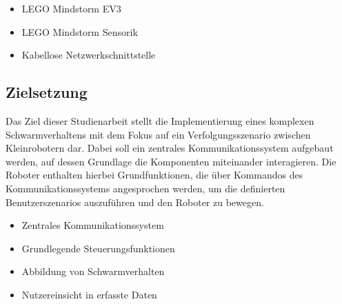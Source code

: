 \begin{itemize}
	\item LEGO Mindstorm EV3
	\item LEGO Mindstorm Sensorik
	\item Kabellose Netzwerkschnittstelle
\end{itemize}

\subsection{Zielsetzung}

Das Ziel dieser Studienarbeit stellt die Implementierung eines komplexen Schwarmverhaltens mit dem Fokus auf ein Verfolgungsszenario zwischen Kleinrobotern dar. Dabei soll ein zentrales Kommunikationssystem aufgebaut werden, auf dessen Grundlage die Komponenten miteinander interagieren. Die Roboter enthalten hierbei Grundfunktionen, die über Kommandos des Kommunikationssystems angesprochen werden, um die definierten Benutzerszenarios auszuführen und den Roboter zu bewegen.

\begin{itemize}
	\item Zentrales Kommunikationssystem
	\item Grundlegende Steuerungsfunktionen
	\item Abbildung von Schwarmverhalten
	\item Nutzereinsicht in erfasste Daten
\end{itemize}

\begin{comment}
	\subsection{Erwartetes Ergebnis}
	
	Erwartet wird ein Ergebnis, indem der Nutzer des Systems über eine mobile App mithilfe einer zentralen STeuereinheit einen beliebigen Kontext für ein ausgewähltes Schwarmverhalten starten kann. Dabei soll eine abstrakte IMplementierung beachtet werden, indem verschiedene RObotertypen und Szenarien für Schwarmverhalten dargestellt sind, um wenn erwünscht ein komplexes Szanrio mit unterschiedlichen RObotern zu starten um definierte AUfgaben zu lösen. Dabei ist vor allem die Implementierung der Grundsteuerung mitsammt der Kommunikation des Systems entscheident.
\end{comment}